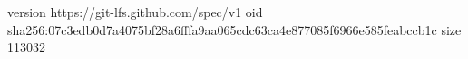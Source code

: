 version https://git-lfs.github.com/spec/v1
oid sha256:07c3edb0d7a4075bf28a6fffa9aa065cdc63ca4e877085f6966e585feabccb1c
size 113032
